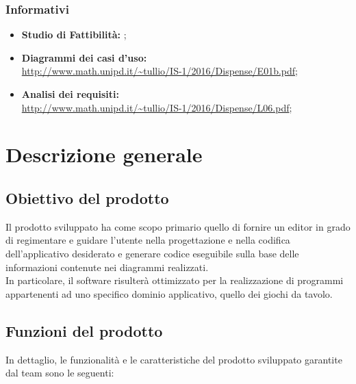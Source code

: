 		\subsubsection{Informativi}
		\begin{itemize}
			\item \textbf{Studio di Fattibilità: }\emph{\SdF};
			\item \textbf{Diagrammi dei casi d'uso:}
			\\ \url{http://www.math.unipd.it/~tullio/IS-1/2016/Dispense/E01b.pdf};
			\item \textbf{Analisi dei requisiti:}
			\\ \url{http://www.math.unipd.it/~tullio/IS-1/2016/Dispense/L06.pdf};
		\end{itemize}
\newpage

\section{Descrizione generale}
	\subsection{Obiettivo del prodotto}
	Il prodotto sviluppato  ha come scopo primario quello di fornire un editor in grado di regimentare e guidare l'utente nella progettazione e nella codifica dell'applicativo desiderato e generare codice eseguibile sulla base delle informazioni contenute nei diagrammi realizzati. 
	\\In particolare, il software risulterà ottimizzato per la realizzazione di programmi appartenenti ad uno specifico dominio applicativo, quello dei giochi da tavolo.
	\subsection{Funzioni del prodotto}
	In dettaglio, le funzionalità e le caratteristiche del prodotto sviluppato garantite dal team \hx{} sono le seguenti:
